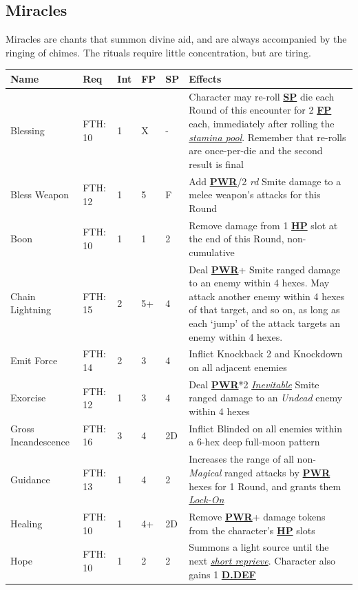 \documentclass[12pt]{article}
\newcommand{\refto}[1]{\hyperlink{#1}{\textbf{#1}}}
\newcommand{\reftoit}[1]{\hyperlink{#1}{\emph{#1}}}
\begin{document}
\subsection{Miracles}
Miracles are chants that summon divine aid, and are always accompanied by the ringing of chimes. The rituals require little concentration, but are tiring.
\begin{center}
\begin{tabularx}{\textwidth}{p{}p{}p{}p{}p{}p{}}
\hline
\textbf{Name} & \textbf{Req} & \textbf{Int} & \textbf{FP} & \textbf{SP} & \textbf{Effects} \\
\hline
Blessing & FTH: 10 & 1 & X & - & Character may re-roll \refto{SP} die each Round of this encounter for 2 \refto{FP} each, immediately after rolling the \reftoit{stamina pool}. Remember that re-rolls are once-per-die and the second result is final\\
Bless Weapon & FTH: 12 & 1 & 5 & F & Add \refto{PWR}/2 \emph{rd} Smite damage to a melee weapon’s attacks for this Round \\
Boon & FTH: 10 & 1 & 1 & 2 & Remove damage from 1 \refto{HP} slot at the end of this Round, non-cumulative\\
Chain Lightning & FTH: 15 & 2 & 5+ & 4 & Deal \refto{PWR}+ Smite ranged damage to an enemy within 4 hexes. \newline
May attack another enemy within 4 hexes of that target, and so on, as long as each ‘jump’ of the attack targets an enemy within 4 hexes. \\
Emit Force & FTH: 14 & 2 & 3 & 4 & Inflict Knockback 2 and Knockdown on all adjacent enemies \\
Exorcise & FTH: 12 & 1 & 3 & 4 & Deal \refto{PWR}*2 \reftoit{Inevitable} Smite ranged damage to an \emph{Undead} enemy within 4 hexes \\
Gross Incandescence & FTH: 16 & 3 & 4 & 2D & Inflict Blinded on all enemies within a 6-hex deep full-moon pattern \\
Guidance & FTH: 13 & 1 & 4 & 2 & Increases the range of all non-\emph{Magical} ranged attacks by \refto{PWR} hexes for 1 Round, and grants them \reftoit{Lock-On} \\
Healing & FTH: 10 & 1 & 4+ & 2D & Remove \refto{PWR}+ damage tokens from the character’s \refto{HP} slots \\
Hope & FTH: 10 & 1 & 2 & 2 & Summons a light source until the next \reftoit{short reprieve}. Character also gains 1 \refto{D.DEF} \\

\end{tabularx}
\end{center}
\end{document}
